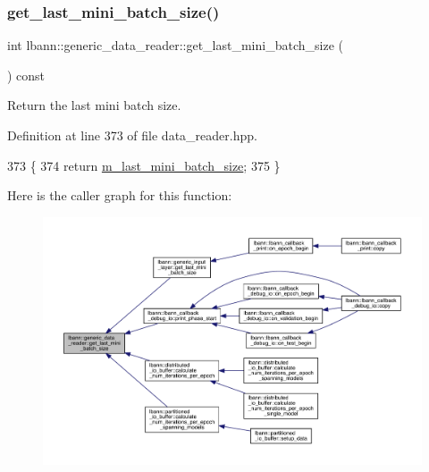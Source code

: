 \subsubsection{\texorpdfstring{get\+\_\+last\+\_\+mini\+\_\+batch\+\_\+size()}{get\_last\_mini\_batch\_size()}}
{\footnotesize\ttfamily int lbann\+::generic\+\_\+data\+\_\+reader\+::get\+\_\+last\+\_\+mini\+\_\+batch\+\_\+size (\begin{DoxyParamCaption}{ }\end{DoxyParamCaption}) const\hspace{0.3cm}{\ttfamily [inline]}}



Return the last mini batch size. 



Definition at line 373 of file data\+\_\+reader.\+hpp.


\begin{DoxyCode}
373                                        \{
374     \textcolor{keywordflow}{return} \hyperlink{classlbann_1_1generic__data__reader_a241f77b6209de4ae656bc34ad51bb612}{m\_last\_mini\_batch\_size};
375   \}
\end{DoxyCode}
Here is the caller graph for this function\+:\nopagebreak
\begin{figure}[H]
\begin{center}
\leavevmode
\includegraphics[width=350pt]{classlbann_1_1generic__data__reader_a79cb3bee4e0d19006ef9213763dc8af2_icgraph}
\end{center}
\end{figure}
\mbox{\label{classlbann_1_1generic__data__reader_a246a719477c8c7b6122d41b6f5618d41}} 

